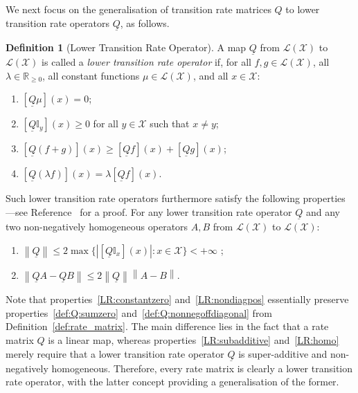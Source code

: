 \documentclass[10pt,a4paper]{paper}
\theoremstyle{definition}
\newtheorem{definition}{Definition}
\newcommand{\reals}{\mathbb{R}}
\newcommand{\realsnonneg}{\reals_{\geq 0}}
\newcommand{\states}{\mathcal{X}}
\newcommand{\gambles}{\mathcal{L}}
\newcommand{\gamblesX}{\gambles(\states)}
\newcommand{\ind}[1]{\mathbb{I}_{#1}}
\newcommand{\lrate}{\underline{Q}}
\newcommand{\norm}[1]{\left\lVert #1 \right\rVert}
\newcommand{\abs}[1]{\left\vert #1 \right\vert}
\begin{document}
We next focus on the generalisation of transition rate matrices $Q$ to lower transition rate operators $\lrate$, as follows.
\begin{definition}[Lower Transition Rate Operator]\label{def:coh_low_trans_rate}
A map $\lrate$ from $\gamblesX$ to $\gamblesX$ is called a \emph{lower transition rate operator} if, for all $f,g\in\gamblesX$, all $\lambda\in\realsnonneg$, all constant functions $\mu\in\gamblesX$, and all $x\in\states$:

\begin{enumerate}[label=LR\arabic*:,ref=LR\arabic*]
\item\label{LR:constantzero}
$\left[\lrate\mu\right](x)=0$;
\item\label{LR:nondiagpos}
$\left[\lrate\ind{y}\right](x)\geq0$ for all $y\in\states$ such that $x\neq y$;
\item\label{LR:subadditive}
$\left[\lrate(f+g)\right](x)\geq\left[\lrate f\right](x)+\left[\lrate g\right](x)$;
\item\label{LR:homo}
$\left[\lrate(\lambda f)\right](x)= \lambda\left[\lrate f\right](x)$.
\end{enumerate}
Such lower transition rate operators furthermore satisfy the following properties---see Reference~\cite{DeBock:2016} for a proof. For any lower transition rate operator $\lrate$ and any two non-negatively homogeneous operators $A,B$ from $\gamblesX$ to $\gamblesX$:
\begin{enumerate}[label=LR\arabic*:,ref=LR\arabic*,start=5]
\item
$\norm{\lrate}\leq 2\max\big\{\abs{[\lrate\ind{x}](x)}\colon x\in\states\big\} < +\infty$ \label{LR:normlratefinite};
\item
$\norm{\lrate A - \lrate B} \leq 2\norm{\lrate}\norm{A - B}.$ \label{LR:differenceofnorm}
\end{enumerate}
\vspace{0pt}
\end{definition}

Note that properties~\ref{LR:constantzero} and~\ref{LR:nondiagpos} essentially preserve properties~\ref{def:Q:sumzero} and~\ref{def:Q:nonnegoffdiagonal} from Definition~\ref{def:rate_matrix}. The main difference lies in the fact that a rate matrix $Q$ is a linear map, whereas properties~\ref{LR:subadditive} and~\ref{LR:homo} merely require that a lower transition rate operator $\lrate$ is super-additive and non-negatively homogeneous. Therefore, every rate matrix is clearly a lower transition rate operator, with the latter concept providing a generalisation of the former.
\end{document}
